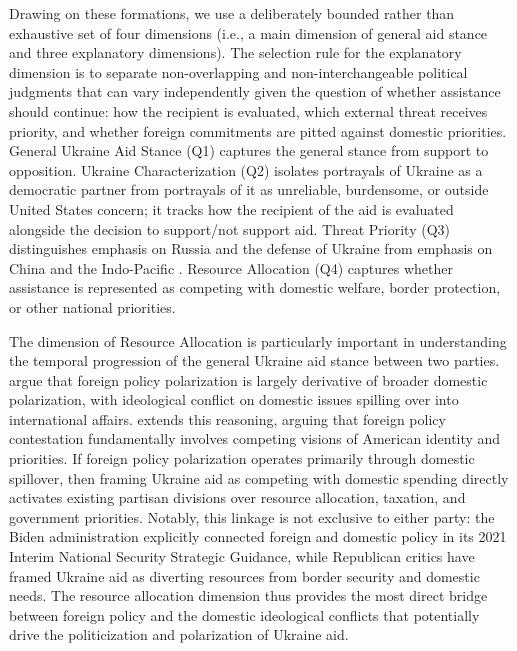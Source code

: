 Drawing on these formations, we use a deliberately bounded rather than exhaustive set of four dimensions (i.e., a main dimension of general aid stance and three explanatory dimensions). The selection rule for the explanatory dimension is to separate non-overlapping and non-interchangeable political judgments that can vary independently given the question of whether assistance should continue: how the recipient is evaluated, which external threat receives priority, and whether foreign commitments are pitted against domestic priorities. General Ukraine Aid Stance (Q1) captures the general stance from support to opposition. Ukraine Characterization (Q2) isolates portrayals of Ukraine as a democratic partner from portrayals of it as unreliable, burdensome, or outside United States concern; it tracks how the recipient of the aid is evaluated alongside the decision to support/not support aid. Threat Priority (Q3) distinguishes emphasis on Russia and the defense of Ukraine from emphasis on China and the Indo-Pacific \citep{harrisWarUkrainePolarised2023a,riegerManchurianCandidateGOPs2025}. Resource Allocation (Q4) captures whether assistance is represented as competing with domestic welfare, border protection, or other national priorities.

The dimension of Resource Allocation is particularly important in understanding the temporal progression of the general Ukraine aid stance between two parties. \citet{jeongDivisionWatersEdge2019} argue that foreign policy polarization is largely derivative of broader domestic polarization, with ideological conflict on domestic issues spilling over into international affairs. \citet{borgBattleSoulThis2024} extends this reasoning, arguing that foreign policy contestation fundamentally involves competing visions of American identity and priorities. If foreign policy polarization operates primarily through domestic spillover, then framing Ukraine aid as competing with domestic spending directly activates existing partisan divisions over resource allocation, taxation, and government priorities. Notably, this linkage is not exclusive to either party: the Biden administration explicitly connected foreign and domestic policy in its 2021 Interim National Security Strategic Guidance, while Republican critics have framed Ukraine aid as diverting resources from border security and domestic needs. The resource allocation dimension thus provides the most direct bridge between foreign policy and the domestic ideological conflicts that potentially drive the politicization and polarization of Ukraine aid.


